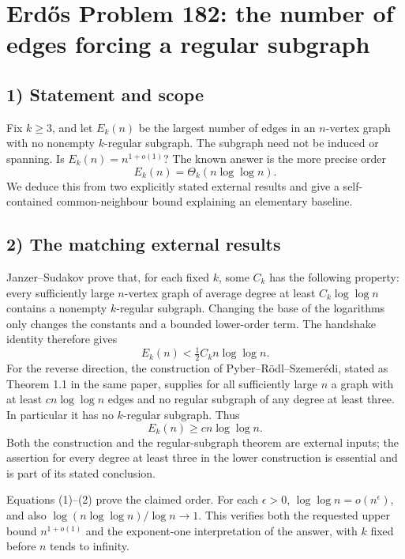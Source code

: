 \section{Erd\H{o}s Problem 182: the number of edges forcing a regular subgraph}

\subsection{1) Statement and scope}
Fix $k\geq3$, and let $E_k(n)$ be the largest number of edges in an
$n$-vertex graph with no nonempty $k$-regular subgraph. The subgraph
need not be induced or spanning. Is $E_k(n)=n^{1+o(1)}$?
The known answer is the more precise order
\[
 E_k(n)=\Theta_k(n\log\log n).
\]
We deduce this from two explicitly stated external results and give a
self-contained common-neighbour bound explaining an elementary baseline.

\subsection{2) The matching external results}
Janzer--Sudakov prove that, for each fixed $k$, some $C_k$ has the
following property: every sufficiently large $n$-vertex graph of average
degree at least $C_k\log\log n$ contains a nonempty $k$-regular subgraph.
Changing the base of the logarithms only changes the constants and a
bounded lower-order term. The handshake identity therefore gives
\[
 E_k(n)<\tfrac12 C_kn\log\log n.                       \tag{1}
\]
For the reverse direction, the construction of Pyber--R\"odl--Szemer\'edi,
stated as Theorem 1.1 in the same paper, supplies for all sufficiently
large $n$ a graph with at least $cn\log\log n$ edges and no regular
subgraph of any degree at least three. In particular it has no
$k$-regular subgraph. Thus
\[
 E_k(n)\geq cn\log\log n.                              \tag{2}
\]
Both the construction and the regular-subgraph theorem are external
inputs; the assertion for every degree at least three in the lower
construction is essential and is part of its stated conclusion.

Equations (1)--(2) prove the claimed order. For each $\epsilon>0$,
$\log\log n=o(n^\epsilon)$, and also
$\log(n\log\log n)/\log n\to1$. This verifies both the requested
upper bound $n^{1+o(1)}$ and the exponent-one interpretation of the
answer, with $k$ fixed before $n$ tends to infinity.

